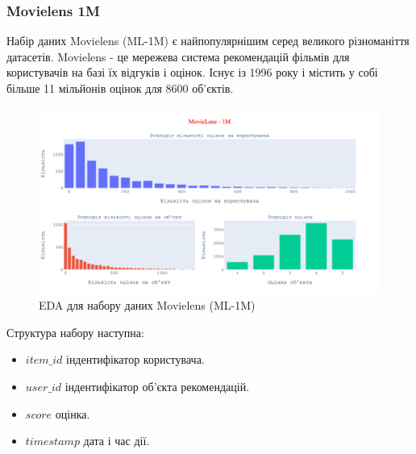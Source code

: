 \subsubsection{Movielens 1M}
Набір даних Movielens (ML-1M) є найпопулярнішим серед великого різноманіття датасетів. Movielens -  це мережева система рекомендацій фільмів для користувачів на базі їх відгуків і оцінок. Існує із 1996 року і містить у собі більше 11 мільйонів оцінок для 8600 об’єктів.
\begin{figure}[H]
    \centering
    \includegraphics[width = 1\textwidth]{images/ML-1m_stat.png}    
    \caption{EDA для набору даних Movielens (ML-1M) }
\end{figure}
Структура набору наступна: 
\begin{itemize}
    \item $item\_id$ індентифікатор користувача.
    \item $user\_id$ індентифікатор об’єкта рекомендацій.
    \item $score$ оцінка.
    \item $timestamp$ дата і час дії.
\end{itemize}

